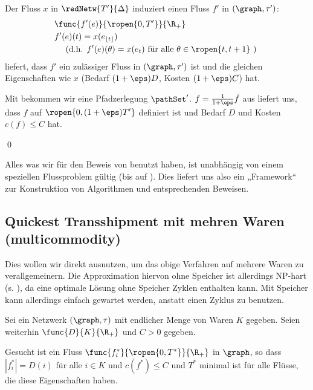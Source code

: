 \begin{standaloneProof}
    Der Fluss $x$ in $\redNetw{T'}{\Delta}$ induziert einen Fluss $f'$ in
    $(\graph, \tau')$:
    \begin{align*}
        & \func{f'(e)}{\ropen{0,T'}}{\R_+} \\
        & f'(e)(t) = x(e_{\lfloor t \rfloor}) \\
        & \quad \text{ (d.h. } f'(e)(\theta) = x(e_t)
            \text{ für alle } \theta \in \ropen{t, t+1} \text{ ) }
    \end{align*}
     liefert, dass $f'$ ein zulässiger Fluss in
    $(\graph, \tau')$ ist und die gleichen Eigenschaften wie $x$
    (Bedarf $(1+\eps)D$, Kosten $(1+\eps)C$) hat.
    
    Mit  bekommen wir eine Pfadzerlegung $\pathSet'$.
    $f = \frac{1}{1+\eps} \bar{f}$ aus  liefert uns, dass
    $f$ auf $\ropen{0, (1 + \eps)T'}$ definiert ist und Bedarf $D$ und Kosten
    $c(f) \leq C$ hat.
    \begin{flushright}\qed \end{flushright}
\end{standaloneProof}

\begin{remark}
    Alles was wir für den Beweis von  benutzt haben, ist
    unabhängig von einem speziellen Flussproblem gültig
    (bis auf ). Dies liefert uns also ein „Framework“
    zur Konstruktion von Algorithmen und entsprechenden Beweisen.
\end{remark}

\subsection{Quickest Transshipment mit mehren Waren (multicommodity)}
Dies wollen wir direkt ausnutzen, um das obige Verfahren auf mehrere
Waren zu verallgemeinern. Die Approximation hiervon ohne Speicher ist allerdings
NP-hart (s. \cite{fleischerSiam}), da eine optimale Lösung ohne Speicher
Zyklen enthalten kann. Mit Speicher kann allerdings einfach gewartet werden,
anstatt einen Zyklus zu benutzen.

\begin{problem}
\label{prob:qtp_multi}
    Sei ein Netzwerk $(\graph, \tau)$ mit endlicher Menge von Waren $K$ gegeben.
    Seien weiterhin $\func{D}{K}{\R_+}$ und $C > 0$ gegeben.

    Gesucht ist ein Fluss $\func{f_i^*}{\ropen{0,T^*}}{\R_+}$ in $\graph$,
    so dass $|f_i^*| = D(i)$ für alle $i \in K$ und
    $c(f^*) \leq C$ und $T^*$ minimal ist für alle Flüsse,
    die diese Eigenschaften haben.
\end{problem}

